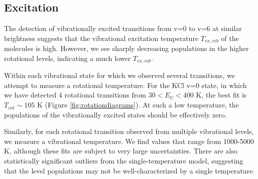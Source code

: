 \documentclass[twocolumn]{aastex62}
\begin{document}
\subsection{Excitation}
The detection of vibrationally excited transitions from v=0 to v=6 at similar
brightness suggests that the vibrational excitation temperature $T_{ex,vib}$ of
the molecules is high.  However, we see sharply decreasing populations in
the higher rotational levels, indicating a much lower $T_{ex,rot}$.




Within each vibrational state for which we observed several transitions, we attempt
to measure a rotational temperature.  For the KCl v=0 state, in which we have
detected 4 rotational transitions from $30 < E_U < 400$ K, the best fit
is $T_{rot}\sim105$ K (Figure
\ref{fig:rotationdiagrams}).  At such a low temperature, the populations of the
vibrationally excited states should be effectively zero.  

Similarly, for each rotational transition observed from multiple vibrational
levels, we measure a vibrational temperature.  We find values that range from
1000-5000 K, although these fits are subject to very large
uncertainties.
There are also statistically significant
outliers from the single-temperature model, suggesting that the level
populations may not be well-characterized by a single temperature.
\end{document}
